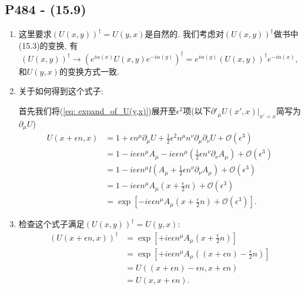 \subsection{P484 - (15.9)}

\begin{enumerate}
  \item 这里要求$(U(x,y))^{\dagger} = U(y,x)$是自然的.
        我们考虑对$(U(x,y))^{\dagger}$做书中(15.3)的变换, 有
        \begin{equation}
          (U(x,y))^{\dagger} \rightarrow (e^{i\alpha(x)}U(x,y)e^{-i\alpha(y)})^{\dagger} = e^{i\alpha(y)}(U(x,y))^{\dagger}e^{-i\alpha(x)},
        \end{equation}
        和$U(y,x)$的变换方式一致.

  \item 关于如何得到这个式子:

        首先我们将(\ref{eq: expand_of_U(y,x)})展开至$\epsilon^2$项(以下$\partial'_{\mu}U(x', x)|_{x' = x}$简写为$\partial_{\mu}U$)
        \begin{equation}
          \begin{aligned}
            U(x+\epsilon n, x) & = 1 + \epsilon n^{\mu} \partial_{\mu}U + \tfrac{1}{2}\epsilon^2 n^{\mu} n^{\nu} \partial_{\mu} \partial_{\nu}U + \mathcal{O}(\epsilon^3) \\
                               & = 1 - ie\epsilon n^{\mu}A_{\mu} - ie\epsilon n^{\mu} (\tfrac{1}{2} \epsilon n^{\nu} \partial_{\nu} A_{\mu}) + \mathcal{O}(\epsilon^3)    \\
                               & = 1 - ie\epsilon n^{\mu}l(A_{\mu} + \tfrac{1}{2} \epsilon n^{\nu} \partial_{\nu} A_{\mu}) + \mathcal{O}(\epsilon^3)                      \\
                               & = 1 - ie\epsilon n^{\mu}A_{\mu}(x+\tfrac{\epsilon}{2}n) + \mathcal{O}(\epsilon^3)                                                        \\
                               & = \exp[-ie\epsilon n^{\mu}A_{\mu}(x+\tfrac{\epsilon}{2}n) + \mathcal{O}(\epsilon^3)].
          \end{aligned}
        \end{equation}

  \item 检查这个式子满足$(U(x,y))^{\dagger} = U(y,x)$:
        \begin{equation}
          \begin{aligned}
            (U(x+\epsilon n, x))^{\dagger} & = \exp[+ie\epsilon n^{\mu}A_{\mu}(x+\tfrac{\epsilon}{2}n)]                \\
                                           & = \exp[+ie\epsilon n^{\mu}A_{\mu}((x+\epsilon n) - \tfrac{\epsilon}{2}n)] \\
                                           & = U((x+\epsilon n)-\epsilon n, x+\epsilon n)                              \\
                                           & = U(x, x+\epsilon n).
          \end{aligned}
        \end{equation}
\end{enumerate}

